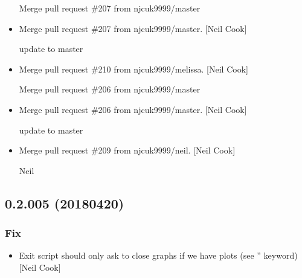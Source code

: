 \documentclass[a4paper,10pt,english]{report}
\begin{document}
\begin{itemize}
Merge pull request \#207 from njcuk9999/master

\item {} 
Merge pull request \#207 from njcuk9999/master. {[}Neil Cook{]}

update to master

\item {} 
Merge pull request \#210 from njcuk9999/melissa. {[}Neil Cook{]}

Merge pull request \#206 from njcuk9999/master

\item {} 
Merge pull request \#206 from njcuk9999/master. {[}Neil Cook{]}

update to master

\item {} 
Merge pull request \#209 from njcuk9999/neil. {[}Neil Cook{]}

Neil

\end{itemize}


\subsection{0.2.005 (2018\sphinxhyphen{}04\sphinxhyphen{}20)}
\label{\detokenize{misc/changelog:id475}}

\subsubsection{Fix}
\label{\detokenize{misc/changelog:fix}}\begin{itemize}
\item {} 
Exit script should only ask to close graphs if we have plots (see
” keyword) {[}Neil Cook{]}

\end{itemize}
\end{document}
